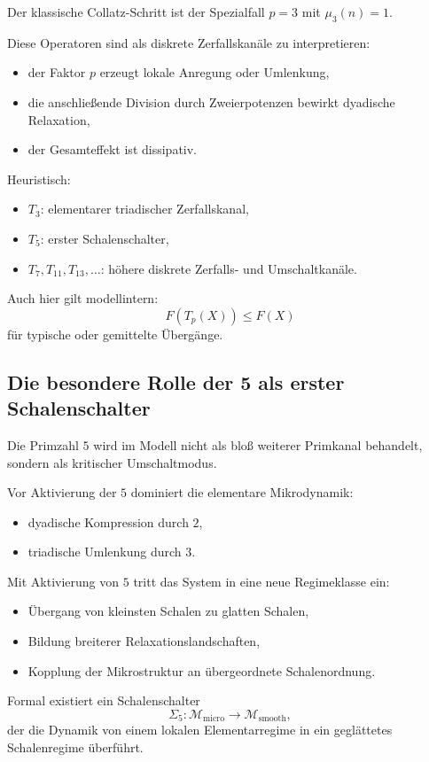 \documentclass[11pt,a4paper]{article}
\theoremstyle{definition}
\begin{document}
Der klassische Collatz-Schritt ist der Spezialfall $p=3$ mit $\mu_3(n)=1$.

Diese Operatoren sind als diskrete Zerfallskanäle zu interpretieren:
\begin{itemize}
	\item der Faktor $p$ erzeugt lokale Anregung oder Umlenkung,
	\item die anschließende Division durch Zweierpotenzen bewirkt dyadische Relaxation,
	\item der Gesamteffekt ist dissipativ.
\end{itemize}

Heuristisch:
\begin{itemize}
	\item $T_3$: elementarer triadischer Zerfallskanal,
	\item $T_5$: erster Schalenschalter,
	\item $T_7,T_{11},T_{13},\dots$: höhere diskrete Zerfalls- und Umschaltkanäle.
\end{itemize}

Auch hier gilt modellintern:
\[
F(T_p(X))\le F(X)
\]
für typische oder gemittelte Übergänge.

\subsection{Die besondere Rolle der 5 als erster Schalenschalter}

Die Primzahl $5$ wird im Modell nicht als bloß weiterer Primkanal behandelt, sondern als kritischer Umschaltmodus.

Vor Aktivierung der $5$ dominiert die elementare Mikrodynamik:
\begin{itemize}
	\item dyadische Kompression durch $2$,
	\item triadische Umlenkung durch $3$.
\end{itemize}

Mit Aktivierung von $5$ tritt das System in eine neue Regimeklasse ein:
\begin{itemize}
	\item Übergang von kleinsten Schalen zu glatten Schalen,
	\item Bildung breiterer Relaxationslandschaften,
	\item Kopplung der Mikrostruktur an übergeordnete Schalenordnung.
\end{itemize}

Formal existiert ein Schalenschalter
\[
\Sigma_5:\mathcal{M}_{\mathrm{micro}}\to\mathcal{M}_{\mathrm{smooth}},
\]
der die Dynamik von einem lokalen Elementarregime in ein geglättetes Schalenregime überführt.
\end{document}
